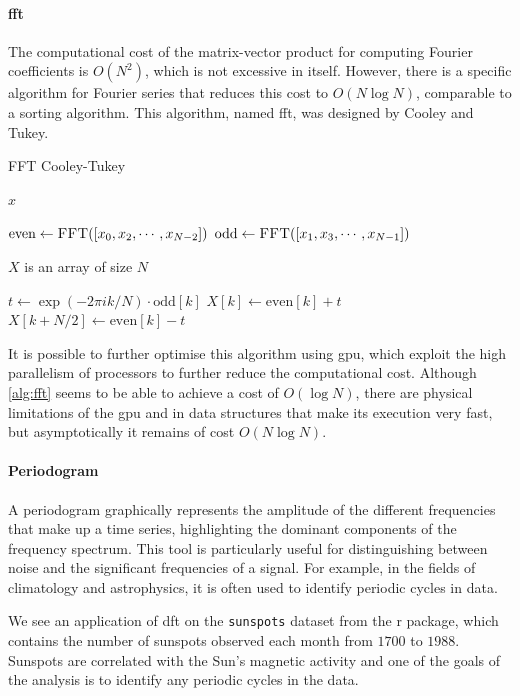 \paragraph{\gls{fft}} The computational cost of the matrix-vector product for computing Fourier coefficients is $O(N^2)$, which is not excessive in itself. However, there is a specific algorithm for Fourier series that reduces this cost to $O(N\log{N})$, comparable to a sorting algorithm. This algorithm, named \gls{fft}, was designed by Cooley and Tukey.

\begin{algorithm}[h]
	\caption{FFT Cooley-Tukey}
	\begin{algorithmic}[1]
			\Return $x$
		\EndIf

		\State $\text{even} \gets \Call{FFT}{\left[x_0,x_2,\cdots, x_{N-2}\right]}$
		\State $\text{odd} \gets \Call{FFT}{\left[x_1,x_3,\cdots, x_{N-1}\right]}$

		\State $X$ is an array of size $N$

			\State $t \gets \exp\left(-2\pi i k / N\right)\cdot \text{odd}[k]$
			\State $X[k] \gets \text{even}[k] + t$
			\State $X[k + N/2] \gets \text{even}[k] - t$
		\EndFor
		\EndProcedure
	\end{algorithmic}
	\label{alg:fft}
\end{algorithm}

\noindent It is possible to further optimise this algorithm using \gls{gpu}, which exploit the high parallelism of processors to further reduce the computational cost. Although \cref{alg:fft} seems to be able to achieve a cost of $O(\log{N})$, there are physical limitations of the \gls{gpu} and in data structures that make its execution very fast, but asymptotically it remains of cost $O(N\log{N})$.

\paragraph{Periodogram} A periodogram graphically represents the amplitude of the different frequencies that make up a time series, highlighting the dominant components of the frequency spectrum. This tool is particularly useful for distinguishing between noise and the significant frequencies of a signal. For example, in the fields of climatology and astrophysics, it is often used to identify periodic cycles in data.

\noindent We see an application of \gls{dft} on the \texttt{sunspots} dataset from the \gls{r} package, which contains the number of sunspots observed each month from $1700$ to $1988$. Sunspots are correlated with the Sun's magnetic activity and one of the goals of the analysis is to identify any periodic cycles in the data.

